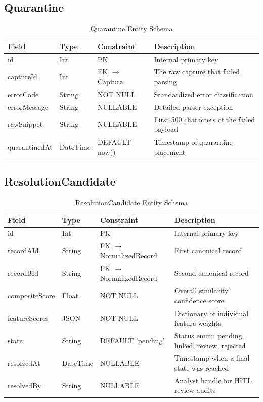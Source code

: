 \subsection{Quarantine}
\begin{table}[htpb]
\centering
\begin{tabular}{lllp{6cm}}
\toprule
\textbf{Field} & \textbf{Type} & \textbf{Constraint} & \textbf{Description} \\
\midrule
id & Int & PK & Internal primary key \\
captureId & Int & FK $\rightarrow$ Capture & The raw capture that failed parsing \\
errorCode & String & NOT NULL & Standardized error classification \\
errorMessage & String & NULLABLE & Detailed parser exception \\
rawSnippet & String & NULLABLE & First 500 characters of the failed payload \\
quarantinedAt & DateTime & DEFAULT now() & Timestamp of quarantine placement \\
\bottomrule
\end{tabular}
\caption{Quarantine Entity Schema}
\end{table}

\subsection{ResolutionCandidate}
\begin{table}[htpb]
\centering
\begin{tabular}{lllp{6cm}}
\toprule
\textbf{Field} & \textbf{Type} & \textbf{Constraint} & \textbf{Description} \\
\midrule
id & Int & PK & Internal primary key \\
recordAId & String & FK $\rightarrow$ NormalizedRecord & First canonical record \\
recordBId & String & FK $\rightarrow$ NormalizedRecord & Second canonical record \\
compositeScore & Float & NOT NULL & Overall similarity confidence score \\
featureScores & JSON & NOT NULL & Dictionary of individual feature weights \\
state & String & DEFAULT 'pending' & Status enum: pending, linked, review, rejected \\
resolvedAt & DateTime & NULLABLE & Timestamp when a final state was reached \\
resolvedBy & String & NULLABLE & Analyst handle for HITL review audits \\
\bottomrule
\end{tabular}
\caption{ResolutionCandidate Entity Schema}
\end{table}

